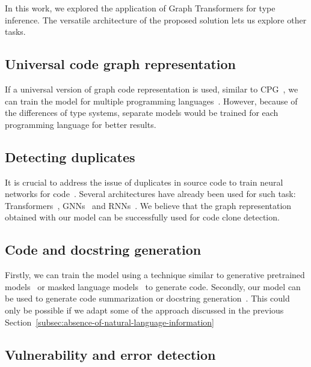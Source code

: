 In this work, we explored the application of Graph Transformers for type inference.
The versatile architecture of the proposed solution lets us explore other tasks.

\subsection{Universal code graph representation}\label{subsec:universal-code-graph-representation}

If a universal version of graph code representation is used, similar to CPG~\cite{yamaguchi2014modeling},
we can train the model for multiple programming languages~\cite{wang_unified_2022}.
However, because of the differences of type systems, separate models would be trained for each programming language for better results.

\subsection{Detecting duplicates}\label{subsec:detecting-duplicates}

It is crucial to address the issue of duplicates in source code to train neural networks for code~\cite{allamanis2020typilus,mir_type4py_2021}.
Several architectures have already been used for such task: Transformers~\cite{zhang2023efficient}, GNNs~\cite{wang_detecting_2020} and RNNs~\cite{yasaswi2017plagiarism}.
We believe that the graph representation obtained with our model can be successfully used for code clone detection.

\subsection{Code and docstring generation}\label{subsec:code-generation}

Firstly, we can train the model using a technique similar to generative pretrained models~\cite{radford_language_2019,brown_language_2020} or masked language models~\cite{tipirneni_structcoder_2022} to generate code.
Secondly, our model can be used to generate code summarization or docstring generation~\cite{barone_parallel_2017,liu_haconvgnn_2021}.
This could only be possible if we adapt some of the approach discussed in the previous Section~\ref{subsec:absence-of-natural-language-information}

\subsection{Vulnerability and error detection}\label{subsec:vulnerability-and-error-detection}

